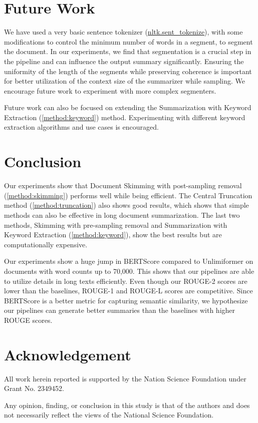 \section{Future Work}
	\label{sec:future-work}

	We have used a very basic sentence tokenizer
	(\href{https://www.nltk.org/api/nltk.tokenize.sent_tokenize.html}{nltk.sent\_tokenize}),
	with some modifications to control the minimum number of words in a segment,
	to segment the document.
	In our experiments, we find that segmentation is a crucial step in the pipeline and can
	influence the output summary significantly.
	Ensuring the uniformity of the length of the segments while preserving coherence is
	important for better utilization of the context size of the summarizer while sampling.
	We encourage future work to experiment with more complex segmenters.

	Future work can also be focused on extending the Summarization with Keyword Extraction
	(\ref{method:keyword}) method.
	Experimenting with different keyword extraction algorithms and use cases is encouraged.


\section{Conclusion}
\label{sec:conclusion}

	Our experiments show that Document Skimming with post-sampling removal
	(\ref{method:skimming}) performs well while being efficient.
	The Central Truncation method (\ref{method:truncation}) also shows good results,
	which shows that simple methods can also be effective in long document summarization.
	The last two methods, Skimming with pre-sampling removal and Summarization with Keyword
	Extraction (\ref{method:keyword}), show the best results but are computationally expensive.

	Our experiments show a huge jump in BERTScore compared to Unlimiformer on documents
	with word counts up to 70,000.
	This shows that our pipelines are able to utilize details in long texts efficiently.
	Even though our ROUGE-2 scores are lower than the baselines, ROUGE-1 and ROUGE-L
	scores are competitive.
	Since BERTScore is a better metric for capturing semantic similarity, we hypothesize
	our pipelines can generate better summaries than the baselines with higher ROUGE scores.


\section*{Acknowledgement}

	All work herein reported is supported by the Nation Science Foundation under Grant
	No. 2349452.

	Any opinion, finding, or conclusion in this study is that of the authors and does not
	necessarily reflect the views of the National Science Foundation.
